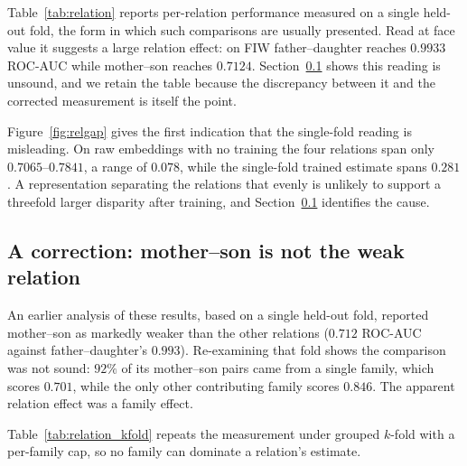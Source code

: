 \documentclass[preprint,12pt]{elsarticle}
\begin{document}
Table~\ref{tab:relation} reports per-relation performance measured on a
single held-out fold, the form in which such comparisons are usually presented.
Read at face value it suggests a large relation effect: on FIW father--daughter
reaches $0.9933$ ROC-AUC while mother--son reaches $0.7124$.
Section~\ref{sec:mscorrection} shows this reading is unsound, and we retain the
table because the discrepancy between it and the corrected measurement is
itself the point.

Figure~\ref{fig:relgap} gives the first indication that the single-fold
reading is misleading. On raw embeddings with no training the four relations
span only $0.7065$--$0.7841$, a range of $0.078$, while the single-fold trained
estimate spans $0.281$. A representation separating the relations that evenly
is unlikely to support a threefold larger disparity after training, and
Section~\ref{sec:mscorrection} identifies the cause.

\subsection{A correction: mother--son is not the weak relation}
\label{sec:mscorrection}

An earlier analysis of these results, based on a single held-out fold,
reported mother--son as markedly weaker than the other relations
($0.712$ ROC-AUC against father--daughter's $0.993$). Re-examining that fold
shows the comparison was not sound: $92\%$ of its mother--son pairs came from a
single family, which scores $0.701$, while the only other contributing family
scores $0.846$. The apparent relation effect was a family effect.

Table~\ref{tab:relation_kfold} repeats the measurement under grouped $k$-fold
with a per-family cap, so no family can dominate a relation's estimate.

\begin{table}[t]
\centering
\caption{Per-relation ROC-AUC under grouped $k$-fold with a per-family cap.
The single-fold column is the earlier, unsound estimate; the remaining columns
are the corrected measurement. Under a protocol in which no family dominates,
the four relations span $0.0310$ ROC-AUC.}
\label{tab:relation_kfold}
\small
{}
\end{table}
\end{document}
